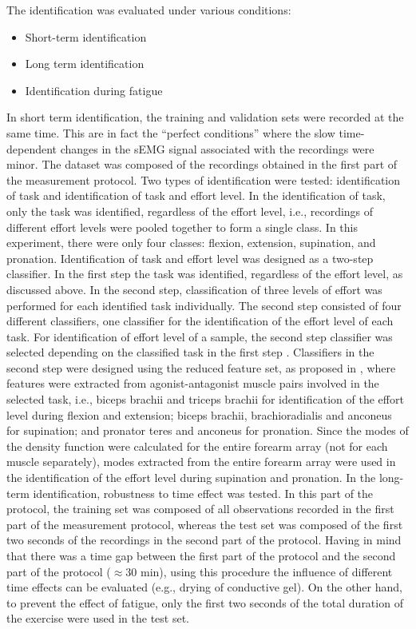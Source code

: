 The identification was evaluated under various conditions:

\begin{itemize}
\item Short-term identification
\item Long term identification
\item Identification during fatigue
\end{itemize}

In short term identification, the training and validation sets were recorded at the same time. This are in fact the “perfect conditions” where the slow time-dependent changes in the sEMG signal associated with the recordings were minor. The dataset was composed of the recordings obtained in the first part of the measurement protocol.
Two types of identification were tested: identification of task and identification of task and effort level. In the identification of task, only the task was identified, regardless of the effort level, i.e., recordings of different effort levels were pooled together to form a single class. In this experiment, there were only four classes: flexion, extension, supination, and pronation. Identification of task and effort level was designed as a two-step classifier. In the first step the task was identified, regardless of the effort level, as discussed above. In the second step, classification of three levels of effort was performed for each identified task individually. The second step consisted of four different classifiers, one classifier for the identification of the effort level of each task. For identification of effort level of a sample, the second step classifier was selected depending on the classified task in the first step \citep{Jordanic2016b}. Classifiers in the second step were designed using the reduced feature set, as proposed in \citep{Jordanic2016b}, where features were extracted from agonist-antagonist muscle pairs involved in the selected task, i.e., biceps brachii and triceps brachii for identification of the effort level during flexion and extension; biceps brachii, brachioradialis and anconeus for supination; and pronator teres and anconeus for pronation. Since the modes of the density function were calculated for the entire forearm array (not for each muscle separately), modes extracted from the entire forearm array were used in the identification of the effort level during supination and pronation.
In the long-term identification, robustness to time effect was tested. In this part of the protocol, the training set was composed of all observations recorded in the first part of the measurement protocol, whereas the test set was composed of the first two seconds of the recordings in the second part of the protocol. Having in mind that there was a time gap between the first part of the protocol and the second part of the protocol ($\approx$30 min), using this procedure the influence of different time effects can be evaluated (e.g., drying of conductive gel). On the other hand, to prevent the effect of fatigue, only the first two seconds of the total duration of the exercise were used in the test set.
